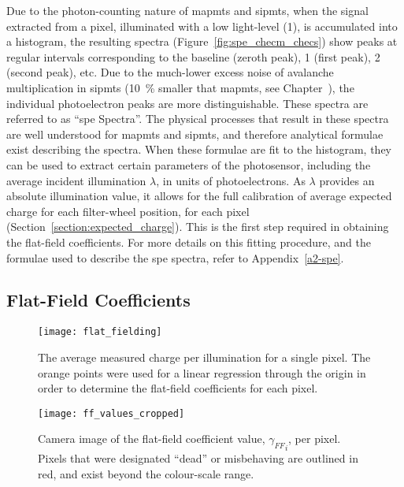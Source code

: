 Due to the photon-counting nature of \glspl{mapmt} and \glspl{sipmt}, when the signal extracted from a pixel, illuminated with a low light-level (\utilde\SI{1}{\pe}), is accumulated into a histogram, the resulting spectra (Figure~\ref{fig:spe_checm_checs}) show peaks at regular intervals corresponding to the baseline (zeroth peak), \SI{1}{\pe} (first peak), \SI{2}{\pe} (second peak), etc. Due to the much-lower excess noise of avalanche multiplication in \glspl{sipmt} (\SI{10}{\percent} smaller that \glspl{mapmt}, see Chapter~), the individual photoelectron peaks are more distinguishable. These spectra are referred to as ``\gls{spe} Spectra''. The physical processes that result in these spectra are well understood for \glspl{mapmt} and \glspl{sipmt}, and therefore analytical formulae  exist describing the spectra. When these formulae are fit to the histogram, they can be used to extract certain parameters of the photosensor, including the average incident illumination $\lambda$, in units of photoelectrons. As $\lambda$ provides an absolute illumination value, it allows for the full calibration of average expected charge for each filter-wheel position, for each pixel (Section~\ref{section:expected_charge}). This is the first step required in obtaining the flat-field coefficients. For more details on this fitting procedure, and the formulae used to describe the \gls{spe} spectra, refer to Appendix~\ref{a2-spe}.

\subsection{Flat-Field Coefficients}

\begin{figure}
	\centering
    \texttt{[image: flat\_fielding]} 
	\caption[Flat-field calibration]{The average measured charge per illumination for a single pixel. The orange points were used for a linear regression through the origin in order to determine the flat-field coefficients for each pixel.} 
	\label{fig:flat_fielding}
\end{figure}

\begin{figure}
	\centering
    \texttt{[image: ff\_values\_cropped]} 
	\caption[Flat-field Coefficients]{Camera image of the flat-field coefficient value, ${\gamma_{FF}}_i$, per pixel. Pixels that were designated ``dead'' or misbehaving are outlined in red, and exist beyond the colour-scale range.}
	\label{fig:ff_values}
\end{figure}

